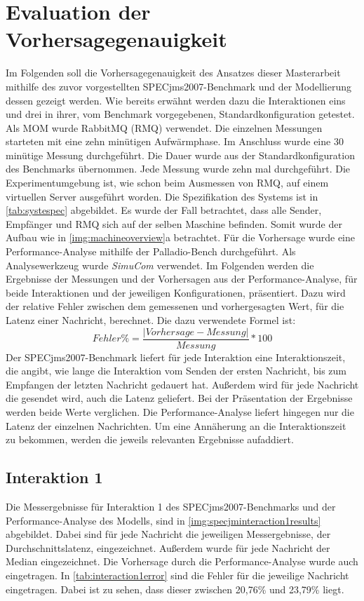 \section{Evaluation der Vorhersagegenauigkeit}
\label{sec:specjmsmodellvorhersage}
Im Folgenden soll die Vorhersagegenauigkeit des Ansatzes dieser Masterarbeit mithilfe des zuvor vorgestellten SPECjms2007-Benchmark und der Modellierung dessen gezeigt werden. Wie bereits erwähnt werden dazu die Interaktionen eins und drei in ihrer, vom Benchmark vorgegebenen, Standardkonfiguration getestet. Als MOM wurde RabbitMQ (RMQ) verwendet. Die einzelnen Messungen starteten mit eine zehn minütigen Aufwärmphase. Im Anschluss wurde eine 30 minütige Messung durchgeführt. Die Dauer wurde aus der Standardkonfiguration des Benchmarks übernommen. Jede Messung wurde zehn mal durchgeführt. Die Experimentumgebung ist, wie schon beim Ausmessen von RMQ, auf einem virtuellen Server ausgeführt worden. Die Spezifikation des Systems ist in \autoref{tab:systespec} abgebildet. Es wurde der Fall betrachtet, dass alle Sender, Empfänger und RMQ sich auf der selben Maschine befinden. Somit wurde der Aufbau wie in \autoref{img:machineoverview}a betrachtet. Für die Vorhersage wurde eine Performance-Analyse mithilfe der Palladio-Bench durchgeführt. Als Analysewerkzeug wurde \emph{SimuCom} verwendet. Im Folgenden werden die Ergebnisse der Messungen und der Vorhersagen aus der Performance-Analyse, für beide Interaktionen und der jeweiligen Konfigurationen, präsentiert. Dazu wird der relative Fehler zwischen dem gemessenen und vorhergesagten Wert, für die Latenz einer Nachricht, berechnet. Die dazu verwendete Formel ist:
\[ Fehler\% = \frac{|Vorhersage - Messung|}{Messung} * 100 \]
Der SPECjms2007-Benchmark liefert für jede Interaktion eine Interaktionszeit, die angibt, wie lange die Interaktion vom Senden der ersten Nachricht, bis zum Empfangen der letzten Nachricht gedauert hat. Außerdem wird für jede Nachricht die gesendet wird, auch die Latenz geliefert. Bei der Präsentation der Ergebnisse werden beide Werte verglichen. Die Performance-Analyse liefert hingegen nur die Latenz der einzelnen Nachrichten. Um eine Annäherung an die Interaktionszeit zu bekommen, werden die jeweils relevanten Ergebnisse aufaddiert.
\subsection{Interaktion 1}
Die Messergebnisse für Interaktion 1 des SPECjms2007-Benchmarks und der Performance-Analyse des Modells, sind in \autoref{img:specjminteraction1results} abgebildet. Dabei sind für jede Nachricht die jeweiligen Messergebnisse, der Durchschnittslatenz, eingezeichnet. Außerdem wurde für jede Nachricht der Median eingezeichnet. Die Vorhersage durch die Performance-Analyse wurde auch eingetragen. In \autoref{tab:interaction1error} sind die Fehler für die jeweilige Nachricht eingetragen. Dabei ist zu sehen, dass dieser zwischen 20,76\% und 23,79\% liegt. 

